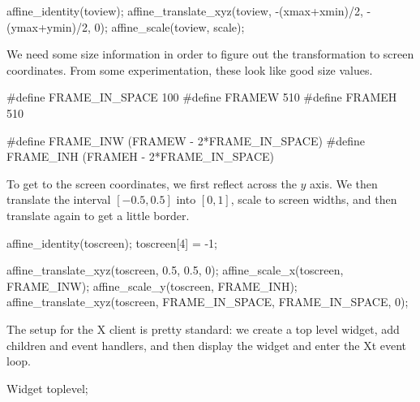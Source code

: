 affine_identity(toview);
affine_translate_xyz(toview, -(xmax+xmin)/2, -(ymax+ymin)/2, 0);
affine_scale(toview, scale);
\nwendcode{}\nwdocspar

We need some size information in order to figure out the
transformation to screen coordinates.  From some experimentation,
these look like good size values.

\nwenddocs{}\plusendmoddef\nwstartdeflinemarkup{}\nwenddeflinemarkup
#define FRAME_IN_SPACE 100
#define FRAMEW 510
#define FRAMEH 510

#define FRAME_INW (FRAMEW - 2*FRAME_IN_SPACE)
#define FRAME_INH (FRAMEH - 2*FRAME_IN_SPACE)

\nwendcode{}\nwdocspar

To get to the screen coordinates, we first reflect across
the $y$ axis.  We then translate the
interval $[-0.5, 0.5]$ into $[0,1]$, scale to screen widths,
and then translate again to get a little border.

\nwenddocs{}\endmoddef\nwstartdeflinemarkup{}\nwenddeflinemarkup
affine_identity(toscreen);
toscreen[4] = -1;

affine_translate_xyz(toscreen, 0.5, 0.5, 0);
affine_scale_x(toscreen, FRAME_INW);
affine_scale_y(toscreen, FRAME_INH);
affine_translate_xyz(toscreen, FRAME_IN_SPACE, FRAME_IN_SPACE, 0);

\nwendcode{}\nwdocspar

The setup for the X client is pretty standard: we create a top level
widget, add children and event handlers, and then display the widget
and enter the Xt event loop.

\nwenddocs{}\endmoddef\nwstartdeflinemarkup{}\nwenddeflinemarkup
Widget toplevel;
\nwendcode{}\nwdocspar

